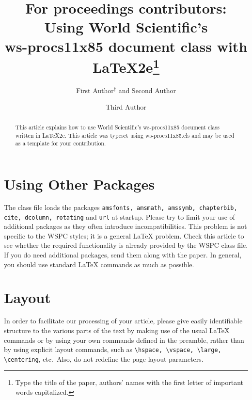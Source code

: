 \documentclass{ws-procs11x85}
\begin{document}
\title{For proceedings contributors: Using World Scientific's\\
ws-procs11x85 document class with \LaTeX2e\footnote{Type the title of the paper,
authors' names with the first letter of important words capitalized.}}

\author{First Author$^\dag$ and Second Author}

\address{University Department, University Name,\\
City, State ZIP/Zone, Country\\
$^\dag$E-mail: ab\_author@university.com\\
www.university\_name.edu}

\author{Third Author}

\address{Group, Laboratory, Street,\\
City, State ZIP/Zone, Country\\
E-mail: an\_author@laboratory.com}

\begin{abstract}
This article explains how to use World Scientific's ws-procs11x85
document class written in \LaTeX2e. This article was typeset using
ws-procs11x85.cls and may be used as a template for your contribution.
\end{abstract}



\section{Using Other Packages}\label{aba:sec1}
The class file loads the packages {\tt amsfonts, amsmath, amssymb,
chapterbib, cite, dcolumn, rotating} and {\tt url} at
startup. Please try to limit your use of additional packages as they
often introduce incompatibilities. This problem is not specific to
the WSPC styles; it is a general \LaTeX{} problem. Check this
article to see whether the required functionality is already
provided by the WSPC class file. If you do need additional packages,
send them along with the paper. In general, you should use standard
\LaTeX{} commands as much as possible.

\section{Layout}
In order to facilitate our processing of your article, please give
easily identifiable structure to the various parts of the text by
making use of the usual \LaTeX{} commands or by using your own commands
defined in the preamble, rather than by using explicit layout
commands, such as \verb|\hspace, \vspace, \large, \centering|,
etc.~Also, do not redefine the page-layout parameters.
\end{document}
